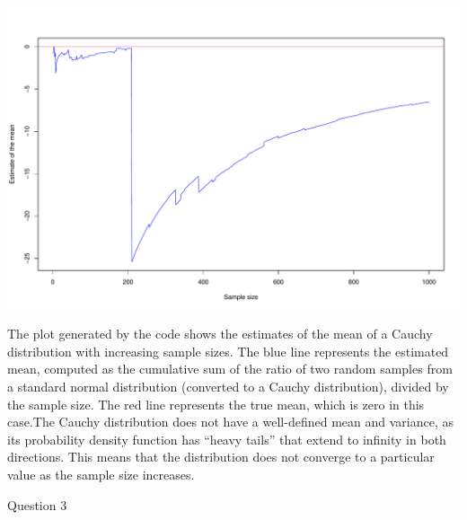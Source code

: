 \documentclass[
  a4paper,
]{article}
\begin{document}
\includegraphics{RMarkdown_files/figure-latex/global_options3-1.pdf}

The plot generated by the code shows the estimates of the mean of a
Cauchy distribution with increasing sample sizes. The blue line
represents the estimated mean, computed as the cumulative sum of the
ratio of two random samples from a standard normal distribution
(converted to a Cauchy distribution), divided by the sample size. The
red line represents the true mean, which is zero in this case.The Cauchy
distribution does not have a well-defined mean and variance, as its
probability density function has ``heavy tails'' that extend to infinity
in both directions. This means that the distribution does not converge
to a particular value as the sample size increases.

Question 3
\end{document}
